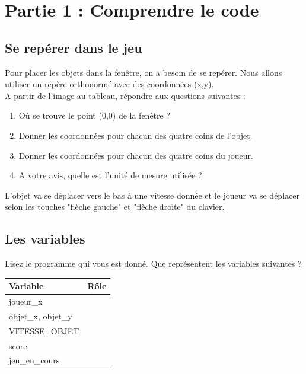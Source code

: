 \section*{Partie 1 : Comprendre le code}

\subsection*{Se repérer dans le jeu}
Pour placer les objets dans la fenêtre, on a besoin de se repérer. Nous allons utiliser un repère orthonormé avec des coordonnées (x,y).\\
A partir de l'image au tableau, répondre aux questions suivantes :
\begin{enumerate}[resume=globalList]
    \item Où se trouve le point (0,0) de la fenêtre ?
    \item Donner les coordonnées pour chacun des quatre coins de l'objet.
    \item Donner les coordonnées pour chacun des quatre coins du joueur.
    \item A votre avis, quelle est l'unité de mesure utilisée ?
\end{enumerate}
\begin{Comprendre}
    L'objet va se déplacer vers le bas à une vitesse donnée et le joueur va se déplacer selon les touches "flèche gauche" et "flèche droite" du clavier.
\end{Comprendre}

\subsection*{Les variables}
\begin{Avous}
    Lisez le programme qui vous est donné. Que représentent les variables suivantes ?
\end{Avous}
\vspace{-1cm}
\begin{table}[!ht]
    \centering
    \begin{tabular}{|l|p{8cm}|}
    \hline
        Variable & Rôle \\ \hline
        joueur\_x &  \\ \hline
        objet\_x, objet\_y &  \\ \hline
        VITESSE\_OBJET &  \\ \hline
        score &  \\ \hline
        jeu\_en\_cours &  \\ \hline
    \end{tabular}
\end{table}


